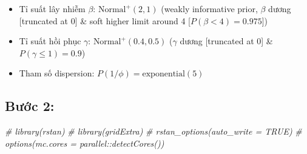 \documentclass[
]{book}
\newenvironment{Shaded}{\begin{snugshade}}{\end{snugshade}}
\newcommand{\CommentTok}[1]{\textcolor[rgb]{0.56,0.35,0.01}{\textit{#1}}}
\providecommand{\tightlist}{%
  \setlength{\itemsep}{0pt}\setlength{\parskip}{0pt}}
\begin{document}
\begin{itemize}
\begin{itemize}
    \begin{itemize}
    \tightlist
    \item
      Tỉ suất lây nhiễm \(\beta\): \(\text{Normal}^+(2, 1)\) (weakly informative prior, \(\beta\) dương {[}truncated at 0{]} \& soft higher limit around 4 {[}\(P(\beta < 4) = 0.975\){]})
    \item
      Tỉ suất hồi phục \(\gamma\): \(\text{Normal}^+(0.4, 0.5)\) (\(\gamma\) dương {[}truncated at 0{]} \& \(P(\gamma \leq 1) = 0.9\))
    \item
      Tham số dispersion: \(P(1/\phi) = \text{exponential}(5)\)
    \end{itemize}
  \end{itemize}
\end{itemize}

\hypertarget{bux1b0ux1edbc-2}{%
\subsection{Bước 2:}\label{bux1b0ux1edbc-2}}

\begin{Shaded}
\begin{Highlighting}[]
\CommentTok{\# library(rstan)}
\CommentTok{\# library(gridExtra)}
\CommentTok{\# rstan\_options(auto\_write = TRUE)}
\CommentTok{\# options(mc.cores = parallel::detectCores())}
\end{Highlighting}
\end{Shaded}
\end{document}

